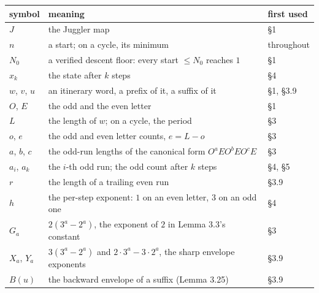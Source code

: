 \documentclass[12pt]{article}
\begin{document}
\begingroup\small

\begin{longtable}[]{@{}
  >{\raggedright\arraybackslash}p{}
  >{\raggedright\arraybackslash}p{}
  >{\raggedright\arraybackslash}p{}@{}}
\toprule\noalign{}
\begin{minipage}[b]{\linewidth}\raggedright
symbol
\end{minipage} & \begin{minipage}[b]{\linewidth}\raggedright
meaning
\end{minipage} & \begin{minipage}[b]{\linewidth}\raggedright
first used
\end{minipage} \\
\midrule\noalign{}
\endhead
\bottomrule\noalign{}
\endfoot
\bottomrule\noalign{}
\endlastfoot
\(J\) & the Juggler map & §1 \\
\(n\) & a start; on a cycle, its minimum & throughout \\
\(N_0\) & a verified descent floor: every start \(\le N_0\) reaches
\(1\) & §1 \\
\(x_k\) & the state after \(k\) steps & §4 \\
\(w\), \(v\), \(u\) & an itinerary word, a prefix of it, a suffix of it
& §1, §3.9 \\
\(O\), \(E\) & the odd and the even letter & §1 \\
\(L\) & the length of \(w\); on a cycle, the period & §3 \\
\(o\), \(e\) & the odd and even letter counts, \(e=L-o\) & §3 \\
\(a\), \(b\), \(c\) & the odd-run lengths of the canonical form
\(O^aEO^bEO^cE\) & §3 \\
\(a_i\), \(a_k\) & the \(i\)-th odd run; the odd count after \(k\) steps
& §4, §5 \\
\(r\) & the length of a trailing even run & §3.9 \\
\(h\) & the per-step exponent: \(1\) on an even letter, \(3\) on an odd
one & §4 \\
\(G_a\) & \(2(3^a-2^a)\), the exponent of \(2\) in Lemma 3.3's constant
& §3 \\
\(X_a\), \(Y_a\) & \(3(3^a-2^a)\) and \(2\cdot3^a-3\cdot2^a\), the sharp
envelope exponents & §3.9 \\
\(B(u)\) & the backward envelope of a suffix (Lemma 3.25) & §3.9 \\

\end{longtable}
\end{document}

